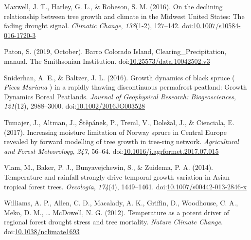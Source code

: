 \documentclass[
]{article}
\newlength{\cslhangindent}
\newenvironment{cslreferences}%
  {\setlength{\parindent}{0pt}%
  \everypar{\setlength{\hangindent}{\cslhangindent}}\ignorespaces}%
  {\par}
\begin{document}
\begin{cslreferences}
\leavevmode\hypertarget{ref-maxwell_declining_2016}{}%
Maxwell, J. T., Harley, G. L., \& Robeson, S. M. (2016). On the
declining relationship between tree growth and climate in the Midwest
United States: The fading drought signal. \emph{Climatic Change},
\emph{138}(1-2), 127--142.
doi:\href{https://doi.org/10.1007/s10584-016-1720-3}{10.1007/s10584-016-1720-3}

\leavevmode\hypertarget{ref-paton_barro_2019}{}%
Paton, S. (2019, October). Barro Colorado Island,
Clearing\_Precipitation, manual. The Smithsonian Institution.
doi:\href{https://doi.org/10.25573/data.10042502.v3}{10.25573/data.10042502.v3}

\leavevmode\hypertarget{ref-sniderhan_growth_2016}{}%
Sniderhan, A. E., \& Baltzer, J. L. (2016). Growth dynamics of black
spruce ( \emph{Picea} \emph{Mariana} ) in a rapidly thawing
discontinuous permafrost peatland: Growth Dynamics Boreal Peatlands.
\emph{Journal of Geophysical Research: Biogeosciences}, \emph{121}(12),
2988--3000.
doi:\href{https://doi.org/10.1002/2016JG003528}{10.1002/2016JG003528}

\leavevmode\hypertarget{ref-tumajer_increasing_2017}{}%
Tumajer, J., Altman, J., Štěpánek, P., Treml, V., Doležal, J., \&
Cienciala, E. (2017). Increasing moisture limitation of Norway spruce in
Central Europe revealed by forward modelling of tree growth in tree-ring
network. \emph{Agricultural and Forest Meteorology}, \emph{247}, 56--64.
doi:\href{https://doi.org/10.1016/j.agrformet.2017.07.015}{10.1016/j.agrformet.2017.07.015}

\leavevmode\hypertarget{ref-vlam_temperature_2014}{}%
Vlam, M., Baker, P. J., Bunyavejchewin, S., \& Zuidema, P. A. (2014).
Temperature and rainfall strongly drive temporal growth variation in
Asian tropical forest trees. \emph{Oecologia}, \emph{174}(4),
1449--1461.
doi:\href{https://doi.org/10.1007/s00442-013-2846-x}{10.1007/s00442-013-2846-x}

\leavevmode\hypertarget{ref-williams_temperature_2012}{}%
Williams, A. P., Allen, C. D., Macalady, A. K., Griffin, D., Woodhouse,
C. A., Meko, D. M., \ldots{} McDowell, N. G. (2012). Temperature as a
potent driver of regional forest drought stress and tree mortality.
\emph{Nature Climate Change}.
doi:\href{https://doi.org/10.1038/nclimate1693}{10.1038/nclimate1693}
\end{cslreferences}
\end{document}
